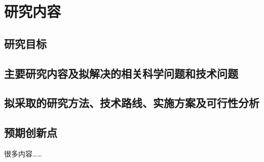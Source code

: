 



\section{研究内容}
\begin{mdframed}[everyline=true]

\subsection{研究目标}

\subsection{主要研究内容及拟解决的相关科学问题和技术问题}
	
\subsection{拟采取的研究方法、技术路线、实施方案及可行性分析}

\subsection{预期创新点}

很多内容……
\\[10 cm]
\end{mdframed}


